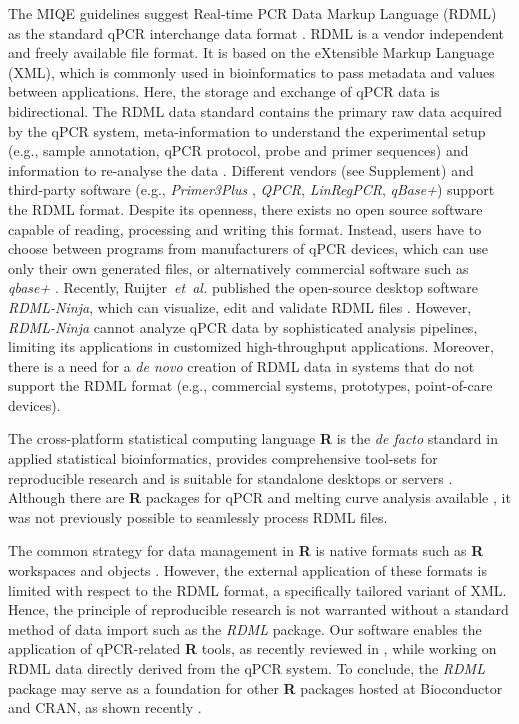 \documentclass{bioinfo}
\begin{document}
The MIQE guidelines suggest Real-time PCR Data Markup Language (RDML) as the standard 
qPCR interchange data format \cite{rdml-ninja_2015}. RDML is a vendor 
independent and freely available file format. It is based on the 
eXtensible Markup Language (XML), which is commonly used in bioinformatics 
\cite{achard_xml_2001} to pass metadata and values between applications. 
Here, the storage and exchange of qPCR data is bidirectional. The RDML data standard 
contains the primary raw data acquired by the qPCR system, meta-information to 
understand the experimental setup (e.g., sample annotation, qPCR protocol, probe 
and primer sequences) and information to re-analyse the data 
\cite{lefever_rdml_2009}. Different vendors (see 
Supplement) and third-party software (e.g., \textit{Primer3Plus} 
\cite{untergasser_2007}, \textit{QPCR}, \textit{LinRegPCR}, \textit{qBase+}) 
\cite{pabinger_2014, rdml-ninja_2015} support the RDML format. Despite its openness, 
there exists no open source software capable of reading, processing and writing 
this format. Instead, users have to choose between programs from manufacturers of qPCR 
devices, which can use only their own generated files, or alternatively commercial software 
such as \textit{qbase+} \cite{pabinger_2014, rdml-ninja_2015}. Recently, 
Ruijter~\textit{et~al.} published the open-source desktop software 
\textit{RDML-Ninja}, which can visualize, edit and validate RDML files 
\cite{rdml-ninja_2015}. However, \textit{RDML-Ninja} cannot analyze qPCR 
data by sophisticated analysis pipelines, limiting its applications in 
customized high-throughput applications. Moreover, there is a need for a \textit{de novo} 
creation of RDML data in systems that do not 
support the RDML format (e.g., commercial systems, prototypes, point-of-care devices). 

The cross-platform statistical computing language \textbf{R} is the \textit{de facto} standard in applied 
statistical bioinformatics, provides comprehensive tool-sets for reproducible research \cite{leeper_archiving_2014, 
liu_r_2014, roediger2015r} and is suitable for standalone desktops or servers \cite{roediger2015r}. 
Although there are \textbf{R} packages for qPCR and melting 
curve analysis available \cite{pabinger_2014, ritz_qpcr_2008, 
roediger_RJ_2013, roediger2015chippcr}, it was not previously possible 
to seamlessly process RDML files.

The common strategy for data management in \textbf{R} is native formats such 
as \textbf{R} workspaces and objects \cite{roediger_rkward_2012}. However, 
the external application of these formats is limited with respect to the RDML format, 
a specifically tailored variant of XML. Hence, the principle of reproducible research 
is not warranted without a standard method of data import such as the \textit{RDML} 
package. Our software enables the application of qPCR-related \textbf{R} tools, as 
recently reviewed in \cite{pabinger_2014}, while working on RDML data directly 
derived from the qPCR system. To conclude, the \textit{RDML} package may 
serve as a foundation for other \textbf{R} packages hosted at Bioconductor 
\cite{gentleman_2004} and CRAN, as shown recently \cite{roediger2015r}.
\end{document}
